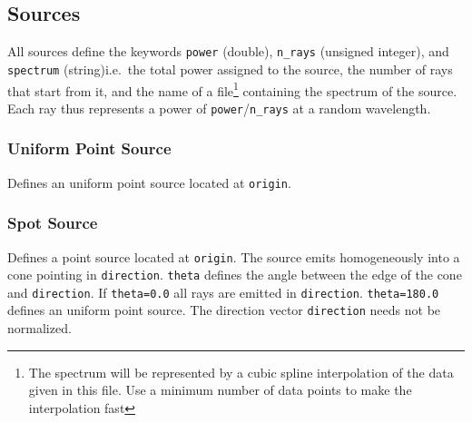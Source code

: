 \documentclass[10pt,a4paper,titlepage]{article}
\begin{document}
\subsection{Sources}

All sources define the keywords {\tt power} (double), {\tt n\_rays} (unsigned integer), and {\tt spectrum} (string)i.e.~the total power assigned to the source, the number of rays that start from it, and the name of a file\footnote{The spectrum will be represented by a cubic spline interpolation of the data given in this file. Use a minimum number of data points to make the interpolation fast} containing the spectrum of the source. Each ray thus represents a power of {\tt power}/{\tt n\_rays} at a random wavelength.

\subsubsection{Uniform Point Source}







Defines an uniform point source located at {\tt origin}. 


\subsubsection{Spot Source}









Defines a point source located at {\tt origin}. The source emits homogeneously into a cone pointing in {\tt direction}. {\tt theta} defines the angle between the edge of the cone and {\tt direction}. If {\tt theta=0.0} all rays are emitted in {\tt direction}. {\tt theta=180.0} defines an uniform point source. The direction vector {\tt direction} needs not be normalized.
\end{document}
